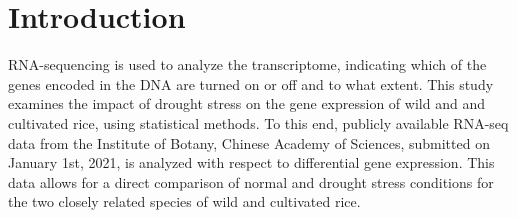 \section{Introduction}

RNA-sequencing is used to analyze the transcriptome, indicating which of the genes encoded in the DNA are turned on or off and to what extent. This study examines the impact of drought stress on the gene expression of wild and and cultivated rice, using statistical methods. To this end, publicly available RNA-seq data from the Institute of Botany, Chinese Academy of Sciences, submitted on January 1st, 2021, is analyzed with respect to differential gene expression. This data allows for a direct comparison of normal and drought stress conditions for the two closely related species of wild and cultivated rice.